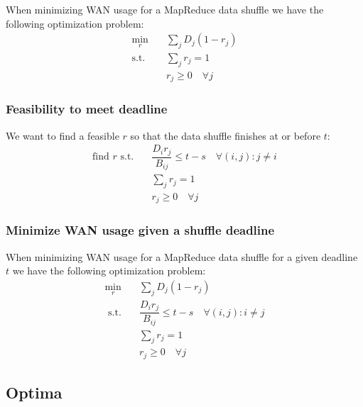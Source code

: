 When minimizing WAN usage for a MapReduce data shuffle we have the following optimization problem:
\begin{subequations}
	\begin{align}
		\min_{r} \quad & \sum_{j}D_j(1-r_j) \\
		\text{s.t.} \quad & \sum_{j}r_{j} = 1 \\
		& r_{j} \geq 0 \quad \forall j
	\end{align}
\end{subequations}

\subsubsection*{Feasibility to meet deadline}

We want to find a feasible $r$ so that the data shuffle finishes at or before $t$:
\begin{subequations}
	\begin{align}
		\text{find } r \text{ s.t.} \quad & \dfrac{D_{i}r_{j}}{B_{ij}} \leq t - s \quad \forall (i,j):j\neq i \\
		& \sum_{j}r_{j} = 1 \\
		& r_{j} \geq 0 \quad \forall j
	\end{align}
\end{subequations}

\subsubsection*{Minimize WAN usage given a shuffle deadline}
When minimizing WAN usage for a MapReduce data shuffle for a given deadline $t$ we have the following optimization problem:
\begin{subequations}\label{eq:opt_1Q_MR_WAN_deadline}
	\begin{align}
		\min_{r} \quad & \sum_{j}D_j(1-r_j) \\
		\text{ s.t.} \quad & \dfrac{D_{i}r_{j}}{B_{ij}} \leq t - s \quad \forall (i,j):i\neq j \\
		& \sum_{j}r_{j} = 1 \\
		& r_{j} \geq 0 \quad \forall j
	\end{align}
\end{subequations}

\subsection{Optima}

